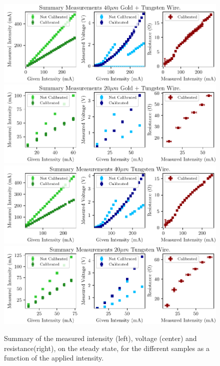 \begin{figure}[h!]
    \centering
    \includegraphics[width=1.0\columnwidth]{Figure_MeasuredValues_IVR/40AuW.pdf}
    \includegraphics[width=1.0\columnwidth]{Figure_MeasuredValues_IVR/20AuW.pdf}
    \includegraphics[width=1.0\columnwidth]{Figure_MeasuredValues_IVR/40W.pdf}
    \includegraphics[width=1.0\columnwidth]{Figure_MeasuredValues_IVR/20W.pdf}
    \caption{Summary of the measured intensity (left), voltage (center) and resistance(right), on the steady state, for the different samples as a function of the applied intensity. }
    \label{fig:SummarySteadyState}
\end{figure}

